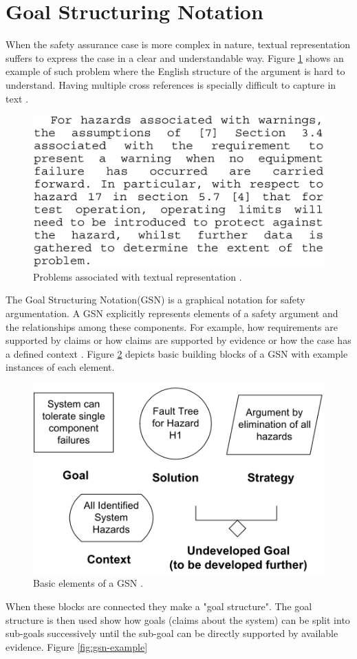 \section{Goal Structuring Notation}
When the safety assurance case is more complex in nature, textual representation suffers to express the case in a clear and understandable way. Figure \ref{fig:text-case} shows an example of such problem where the English structure of the argument is hard to understand. Having multiple cross references is specially difficult to capture in text \cite{gsn2004Kelly}.
\begin{figure}
    \includegraphics[width=0.5\linewidth ]{figures/textual_case.png}
    \centering
    \caption{Problems associated with textual representation \cite{gsn2004Kelly}.}
    \label{fig:text-case}
\end{figure}

The Goal Structuring Notation(GSN) is a graphical notation for safety argumentation. A GSN explicitly represents elements of a safety argument and the relationships among these components. For example, how requirements are supported by claims or how claims are supported by evidence or how the case has a defined context \cite{gsn2004Kelly}. Figure \ref{fig:gsn} depicts basic building blocks of a GSN with example instances of each element. 

\begin{figure}
    \includegraphics[width=0.5\linewidth ]{figures/gsn.png}
    \centering
    \caption{Basic elements of a GSN \cite{gsn2004Kelly}.}
    \label{fig:gsn}
\end{figure}
When these blocks are connected they make a "goal structure". The goal structure is then used show how goals (claims about the system) can be split into sub-goals successively until the sub-goal can be directly supported by available evidence. Figure \ref{fig:gsn-example} 

